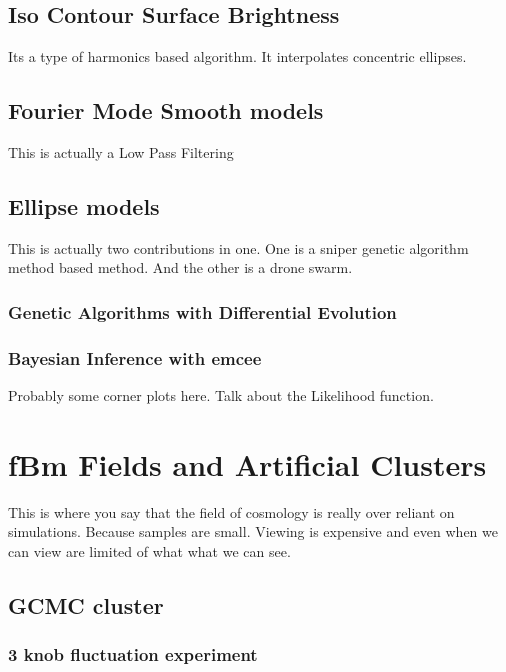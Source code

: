 \subsection{Iso Contour Surface Brightness}\label{Chap:interrogationsIsocontourBrightness}

Its a type of harmonics based algorithm. It interpolates concentric ellipses.

\subsection{Fourier Mode Smooth models}\label{Chap:interrogationsFourierFiltering}

This is actually a Low Pass Filtering

\subsection{Ellipse models}\label{Chap:interrogationsEllipse}

This is actually two contributions in one. One is a sniper genetic algorithm method based method. And the other is a drone swarm.

\subsubsection{Genetic Algorithms with Differential Evolution}\label{Chap:interrogationsEllipseDE}

\subsubsection{Bayesian Inference with emcee}\label{Chap:interrogationsEllipseEmcee}

Probably some corner plots here. Talk about the Likelihood function.

\section{fBm Fields and Artificial Clusters}\label{Chap:assumptionsInterrogationsMethodBody}	%

This is where you say that the field of cosmology is really over reliant on simulations. Because samples are small. Viewing is expensive and even when we can view are limited of what what we can see.

\subsection{GCMC cluster}\label{Chap:interrogationsfBmFields}

\subsubsection{3 knob fluctuation experiment}\label{Chap:interrogationsSimulationBeam}


